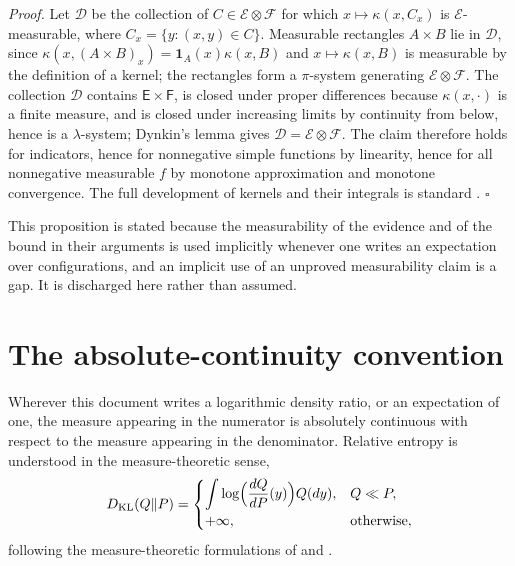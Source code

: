 \noindent\emph{Proof.} Let $\mathcal D$ be the collection of $C\in\mathscr E\otimes\mathscr F$ for which $x\mapsto\kappa(x,C_x)$ is $\mathscr E$-measurable, where $C_x=\{y:(x,y)\in C\}$. Measurable rectangles $A\times B$ lie in $\mathcal D$, since $\kappa(x,(A\times B)_x)=\mathbf 1_A(x)\kappa(x,B)$ and $x\mapsto\kappa(x,B)$ is measurable by the definition of a kernel; the rectangles form a $\pi$-system generating $\mathscr E\otimes\mathscr F$. The collection $\mathcal D$ contains $\mathsf E\times\mathsf F$, is closed under proper differences because $\kappa(x,\cdot)$ is a finite measure, and is closed under increasing limits by continuity from below, hence is a $\lambda$-system; Dynkin's lemma gives $\mathcal D=\mathscr E\otimes\mathscr F$. The claim therefore holds for indicators, hence for nonnegative simple functions by linearity, hence for all nonnegative measurable $f$ by monotone approximation and monotone convergence. The full development of kernels and their integrals is standard \citep{Kallenberg2021}. \hfill$\square$

This proposition is stated because the measurability of the evidence and of the bound in their arguments is used implicitly whenever one writes an expectation over configurations, and an implicit use of an unproved measurability claim is a gap. It is discharged here rather than assumed.

\section{The absolute-continuity convention}
\label{sec:prob-abscont}

\medskip
{}
Wherever this document writes a logarithmic density ratio, or an expectation of one, the measure appearing in the numerator is absolutely continuous with respect to the measure appearing in the denominator. Relative entropy is understood in the measure-theoretic sense,
\begin{equation}
D_{\mathrm{KL}}(Q\Vert P)=
\begin{cases}
\displaystyle\int\log\Bigl(\frac{dQ}{dP}(y)\Bigr)Q(dy), & Q\ll P,\\[1.2ex]
+\infty, & \text{otherwise},
\end{cases}
\label{eq:prob-kl-definition}
\end{equation}
following the measure-theoretic formulations of \citet{Kullback1951} and \citet{Csiszar1967}. 
\medskip


